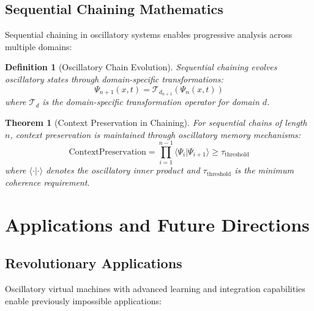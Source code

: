 \documentclass[12pt,a4paper]{article}
\newtheorem{theorem}{Theorem}
\newtheorem{definition}{Definition}
\begin{document}
\subsection{Sequential Chaining Mathematics}

Sequential chaining in oscillatory systems enables progressive analysis across multiple domains:

\begin{definition}[Oscillatory Chain Evolution]
Sequential chaining evolves oscillatory states through domain-specific transformations:
\begin{equation}
\Psi_{n+1}(x,t) = \mathcal{T}_{d_{n+1}}(\Psi_n(x,t))
\end{equation}
where $\mathcal{T}_d$ is the domain-specific transformation operator for domain $d$.
\end{definition}

\begin{theorem}[Context Preservation in Chaining]
For sequential chains of length $n$, context preservation is maintained through oscillatory memory mechanisms:
\begin{equation}
\text{ContextPreservation} = \prod_{i=1}^{n-1} \langle\Psi_i|\Psi_{i+1}\rangle \geq \tau_{\text{threshold}}
\end{equation}
where $\langle\cdot|\cdot\rangle$ denotes the oscillatory inner product and $\tau_{\text{threshold}}$ is the minimum coherence requirement.
\end{theorem}

\section{Applications and Future Directions}

\subsection{Revolutionary Applications}

Oscillatory virtual machines with advanced learning and integration capabilities enable previously impossible applications:
\end{document}
